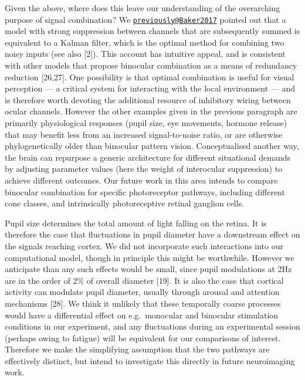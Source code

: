 \documentclass[
]{article}
\begin{document}
Given the above, where does this leave our understanding of the overarching purpose of signal combination? We \href{mailto:previously@Baker2017}{\nolinkurl{previously@Baker2017}} pointed out that a model with strong suppression between channels that are subsequently summed is equivalent to a Kalman filter, which is the optimal method for combining two noisy inputs (see also {[}2{]}). This account has intuitive appeal, and is consistent with other models that propose binocular combination as a means of redundancy reduction {[}26,27{]}. One possibility is that optimal combination is useful for visual perception --- a critical system for interacting with the local environment --- and is therefore worth devoting the additional resource of inhibitory wiring between ocular channels. However the other examples given in the previous paragraph are primarily physiological responses (pupil size, eye movements, hormone release) that may benefit less from an increased signal-to-noise ratio, or are otherwise phylogenetically older than binocular pattern vision. Conceptualised another way, the brain can repurpose a generic architecture for different situational demands by adjusting parameter values (here the weight of interocular suppression) to achieve different outcomes. Our future work in this area intends to compare binocular combination for specific photoreceptor pathways, including different cone classes, and intrinsically photoreceptive retinal ganglion cells.

Pupil size determines the total amount of light falling on the retina. It is therefore the case that fluctuations in pupil diameter have a downstream effect on the signals reaching cortex. We did not incorporate such interactions into our computational model, though in principle this might be worthwhile. However we anticipate than any such effects would be small, since pupil modulations at 2Hz are in the order of 2\% of overall diameter {[}19{]}. It is also the case that cortical activity can modulate pupil diameter, usually through arousal and attention mechanisms {[}28{]}. We think it unlikely that these temporally coarse processes would have a differential effect on e.g.~monocular and binocular stimulation conditions in our experiment, and any fluctuations during an experimental session (perhaps owing to fatigue) will be equivalent for our comparisons of interest. Therefore we make the simplifying assumption that the two pathways are effectively distinct, but intend to investigate this directly in future neuroimaging work.
\end{document}
